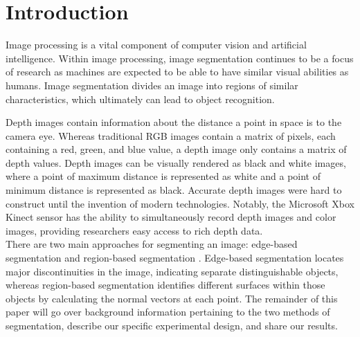 
\section{Introduction}
\label{sec:intro}
Image processing is a vital component of computer vision and
artificial intelligence. Within image processing, image segmentation
continues to be a focus of research as machines are expected to be
able to have similar visual abilities as humans. Image segmentation
divides an image into regions of similar characteristics, which
ultimately can lead to object recognition. 

Depth images contain information about the distance a point in space
is to the camera eye. Whereas traditional RGB images contain a matrix
of pixels, each containing a red, green, and blue value, a depth image
only contains a matrix of depth values. Depth images can be visually
rendered as black and white images, where a point of maximum distance
is represented as white and a point of minimum distance is represented
as black. Accurate depth images were hard to construct until the
invention of modern technologies. Notably, the Microsoft Xbox Kinect
sensor has the ability to simultaneously record depth images and color
images, providing researchers easy access to rich depth data.\\

There are two main approaches for segmenting an image: edge-based
segmentation and region-based segmentation \cite{aima}. Edge-based
segmentation locates major discontinuities in the image, indicating
separate distinguishable objects, whereas region-based segmentation
identifies different surfaces within those objects by calculating the
normal vectors at each point. The remainder of this paper will go over
background information pertaining to the two methods of segmentation,
describe our specific experimental design, and share our results. 


